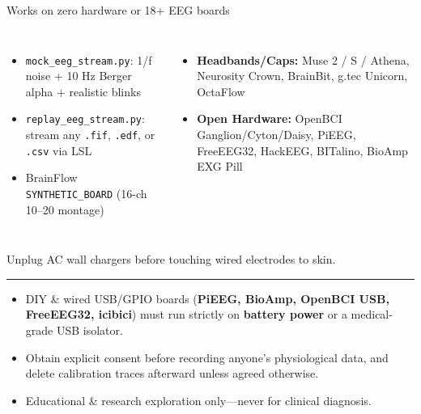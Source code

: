\documentclass[aspectratio=169,11pt,t]{beamer}
\begin{document}
\begin{frame}{Works on zero hardware or 18+ EEG boards}
  \vspace{1mm}
  \begin{columns}[T,onlytextwidth]
      \begin{itemize}\scriptsize\color{NTXInk}
        \item \texttt{mock\_eeg\_stream.py}: 1/f noise + 10 Hz Berger alpha + realistic blinks
        \item \texttt{replay\_eeg\_stream.py}: stream any \texttt{.fif}, \texttt{.edf}, or \texttt{.csv} via LSL
        \item BrainFlow \texttt{SYNTHETIC\_BOARD} (16-ch 10--20 montage)
      \end{itemize}
      \begin{itemize}\scriptsize\color{NTXInk}
        \item \textbf{Headbands/Caps:} Muse 2 / S / Athena, Neurosity Crown, BrainBit, g.tec Unicorn, OctaFlow
        \item \textbf{Open Hardware:} OpenBCI Ganglion/Cyton/Daisy, PiEEG, FreeEEG32, HackEEG, BITalino, BioAmp EXG Pill
      \end{itemize}
  \end{columns}
\end{frame}

\begin{NTXDarkFrame}
  {\NTXSans\bfseries\fontsize{7}{9}\selectfont\color{NTXTeal}\par}\vspace{2.5mm}
  {\NTXSerif\fontsize{22}{27}\selectfont\color{NTXInk}Unplug AC wall chargers before touching wired electrodes to skin.\par}
  \vspace{4mm}
  {\color{NTXRuleActive}\rule{22mm}{0.6pt}\par}\vspace{4mm}
  {\NTXSans\small\color{NTXMuted}
    \begin{itemize}\color{NTXMuted}
      \item DIY \& wired USB/GPIO boards (\textbf{PiEEG, BioAmp, OpenBCI USB, FreeEEG32, icibici}) must run strictly on \textbf{battery power} or a medical-grade USB isolator.
      \item Obtain explicit consent before recording anyone's physiological data, and delete calibration traces afterward unless agreed otherwise.
      \item Educational \& research exploration only---never for clinical diagnosis.
    \end{itemize}
  }
\end{NTXDarkFrame}
\end{document}
